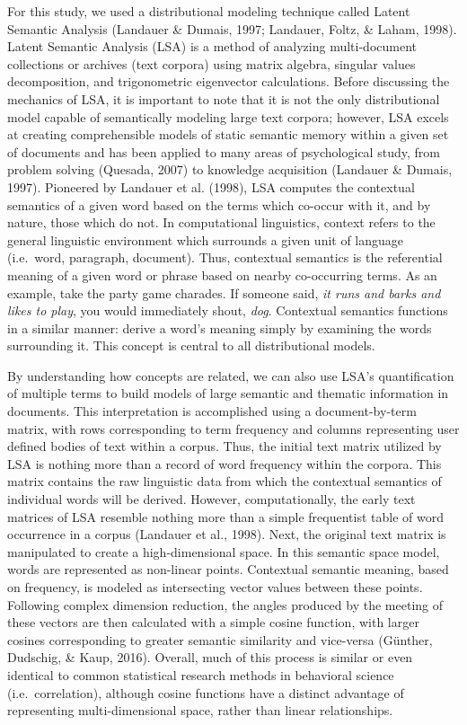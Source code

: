 \documentclass[english,man]{apa6}
\theoremstyle{definition}
\theoremstyle{definition}
\theoremstyle{definition}
\theoremstyle{remark}
\begin{document}
For this study, we used a distributional modeling technique called
Latent Semantic Analysis (Landauer \& Dumais, 1997; Landauer, Foltz, \&
Laham, 1998). Latent Semantic Analysis (LSA) is a method of analyzing
multi-document collections or archives (text corpora) using matrix
algebra, singular values decomposition, and trigonometric eigenvector
calculations. Before discussing the mechanics of LSA, it is important to
note that it is not the only distributional model capable of
semantically modeling large text corpora; however, LSA excels at
creating comprehensible models of static semantic memory within a given
set of documents and has been applied to many areas of psychological
study, from problem solving (Quesada, 2007) to knowledge acquisition
(Landauer \& Dumais, 1997). Pioneered by Landauer et al. (1998), LSA
computes the contextual semantics of a given word based on the terms
which co-occur with it, and by nature, those which do not. In
computational linguistics, context refers to the general linguistic
environment which surrounds a given unit of language (i.e.~word,
paragraph, document). Thus, contextual semantics is the referential
meaning of a given word or phrase based on nearby co-occurring terms. As
an example, take the party game charades. If someone said, \emph{it runs
and barks and likes to play}, you would immediately shout, \emph{dog}.
Contextual semantics functions in a similar manner: derive a word's
meaning simply by examining the words surrounding it. This concept is
central to all distributional models.

By understanding how concepts are related, we can also use LSA's
quantification of multiple terms to build models of large semantic and
thematic information in documents. This interpretation is accomplished
using a document-by-term matrix, with rows corresponding to term
frequency and columns representing user defined bodies of text within a
corpus. Thus, the initial text matrix utilized by LSA is nothing more
than a record of word frequency within the corpora. This matrix contains
the raw linguistic data from which the contextual semantics of
individual words will be derived. However, computationally, the early
text matrices of LSA resemble nothing more than a simple frequentist
table of word occurrence in a corpus (Landauer et al., 1998). Next, the
original text matrix is manipulated to create a high-dimensional space.
In this semantic space model, words are represented as non-linear
points. Contextual semantic meaning, based on frequency, is modeled as
intersecting vector values between these points. Following complex
dimension reduction, the angles produced by the meeting of these vectors
are then calculated with a simple cosine function, with larger cosines
corresponding to greater semantic similarity and vice-versa (Günther,
Dudschig, \& Kaup, 2016). Overall, much of this process is similar or
even identical to common statistical research methods in behavioral
science (i.e.~correlation), although cosine functions have a distinct
advantage of representing multi-dimensional space, rather than linear
relationships.
\end{document}

